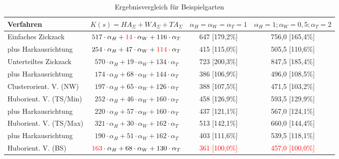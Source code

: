 \begin{center}
\begin{minipage}{\textwidth}
\renewcommand{\arraystretch}{1.5}
\begin{table}[H]
\caption{Ergebnisvergleich für Beispielgarten}
\centering 
\begin{scriptsize}
\begin{tabular}{|l|c|c|c|}
\hline
Verfahren&$K(s)=HA_{\Sigma}+WA_{\Sigma}+TA_{\Sigma}$&$\alpha_H=\alpha_W=\alpha_T=1$&$\alpha_H=1;\alpha_W=0,5;\alpha_T=2$ \\
\hline \hline
Einfaches Zickzack&$517\cdot \alpha_H+\textcolor{red}{14}\cdot \alpha_W+116\cdot \alpha_T$&647 [179,2\%]&756,0 [165,4\%]\\
\hline
plus Harkausrichtung&$254\cdot \alpha_H+47\cdot \alpha_W+\textcolor{red}{114}\cdot \alpha_T$&415 [115,0\%]&505,5 [110,6\%]\\
\hline
Unterteiltes Zickzack&$570\cdot \alpha_H+19\cdot \alpha_W+134\cdot \alpha_T$&723 [200,3\%]&847,5 [185,4\%]\\
\hline
plus Harkausrichtung&$174\cdot \alpha_H+68\cdot \alpha_W+144\cdot \alpha_T$&386 [106,9\%]&496,0 [108,5\%]\\
\hline
Clusterorient. V. (NW) &$197\cdot \alpha_H+65\cdot \alpha_W+126\cdot \alpha_T$&388 [107,5\%]&471,5 [103,2\%]\\
\hline
Huborient. V. (TS/Min)&$252\cdot \alpha_H+46\cdot \alpha_W+160\cdot \alpha_T$&458 [126,9\%]&593,5 [129,9\%]\\
\hline
plus Harkausrichtung&$220\cdot \alpha_H+57\cdot \alpha_W+160\cdot \alpha_T$&437 [121,1\%]&567,0 [124,1\%]\\
\hline
Huborient. V. (TS/Max)&$321\cdot \alpha_H+30\cdot \alpha_W+162\cdot \alpha_T$&513 [142,1\%]&660,0 [144,4\%]\\
\hline
plus Harkausrichtung&$190\cdot \alpha_H+51\cdot \alpha_W+162\cdot \alpha_T$&403 [111,6\%]&539,5 [118,1\%]\\
\hline
Huborient. V. (BS) &$\textcolor{red}{163}\cdot \alpha_H+68\cdot \alpha_W+130\cdot \alpha_T$&\textcolor{red}{361 [100,0\%]}&\textcolor{red}{457,0 [100,0\%]}\\
\hline
\end{tabular}
\label{Beispiel_Ergebnisvergleich}
\end{scriptsize} 
\end{table}
\renewcommand{\arraystretch}{1}
\end{minipage}
\end{center}

